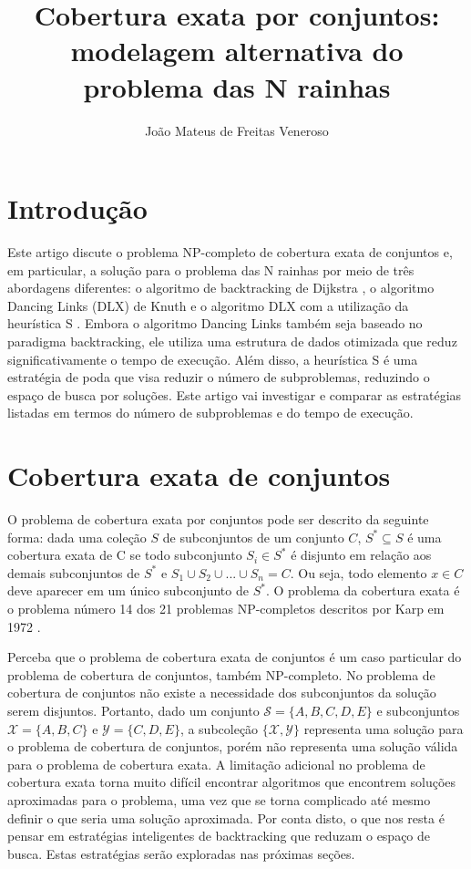 \documentclass{article}
\begin{document}
\title{Cobertura exata por conjuntos: modelagem alternativa do problema das N rainhas}
\author{João Mateus de Freitas Veneroso}

\maketitle

\section{Introdução}

Este artigo discute o problema NP-completo de cobertura exata de conjuntos e, em particular,
a solução para o problema das N rainhas por meio de três abordagens diferentes: 
o algoritmo de backtracking de Dijkstra \cite{djikstra1972}, o algoritmo Dancing Links (DLX) de Knuth e o algoritmo
DLX com a utilização da heurística S \cite{knuth2000}. Embora o algoritmo Dancing Links também seja baseado no paradigma
backtracking, ele utiliza uma estrutura de dados otimizada que reduz significativamente 
o tempo de execução. Além disso, a heurística S é uma estratégia de poda que visa reduzir o número de 
subproblemas, reduzindo o espaço de busca por soluções. Este artigo vai investigar e comparar as
estratégias listadas em termos do número de subproblemas e do tempo de execução.

\section{Cobertura exata de conjuntos}

O problema de cobertura exata por conjuntos pode ser descrito da seguinte forma: 
dada uma coleção $ S $ de subconjuntos de um conjunto $ C $, $ S^* \subseteq S $ é uma cobertura exata de C se 
todo subconjunto $S_i \in S^*$ é disjunto em relação aos demais subconjuntos de $ S^* $ e $ S_1 \cup S_2 \cup ... \cup S_n = C $. Ou
seja, todo elemento $ x \in C $ deve aparecer em um único subconjunto de $ S^* $. O problema da 
cobertura exata é o problema número 14 dos 21 problemas NP-completos descritos por Karp em 1972 \cite{karp1972}.

Perceba que o problema de cobertura exata de conjuntos é um caso particular do problema de cobertura de conjuntos, também
NP-completo. No problema de cobertura de conjuntos não existe a necessidade dos subconjuntos da solução serem disjuntos.
Portanto, dado um conjunto $ \mathcal{S} = \{ A, B, C, D, E \} $ e subconjuntos $ \mathcal{X} = \{ A, B, C \} $ e 
$ \mathcal{Y} = \{ C, D, E \} $, a subcoleção
$ \{ \mathcal{X}, \mathcal{Y} \} $ representa uma solução para o problema de cobertura de conjuntos, porém não representa uma solução válida para 
o problema de cobertura exata. A limitação adicional no problema de cobertura exata torna muito difícil encontrar 
algoritmos que encontrem soluções aproximadas para o problema, uma vez que se torna complicado até mesmo definir o que 
seria uma solução aproximada. Por conta disto, o que nos resta é pensar em estratégias inteligentes
de backtracking que reduzam o espaço de busca. Estas estratégias serão exploradas nas próximas seções.
\end{document}
